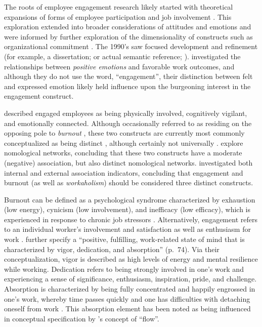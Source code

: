 \documentclass[
]{book}
\begin{document}
The roots of employee \citep[aka work; e.g.,][]{schaufeli_conceptualization_2010} engagement research likely started with theoretical expansions of forms of employee participation \citep[see, for example,][]{ferris_added_1984} and job involvement \citep[e.g.,][]{elloy_examination_1991}. This exploration extended into broader considerations of attitudes and emotions \citep{staw_employee_1994} and were informed by further exploration of the dimensionality of constructs such as organizational commitment \citep{meyer_three-component_1991}. The 1990's saw focused development and refinement (for example, a dissertation; \citet{leone_relation_1995} or actual semantic reference; \citet{kahn_psychological_1990}). \citet{staw_employee_1994} investigated the relationships between \emph{positive emotions} and favorable work outcomes, and although they do not use the word, ``engagement'', their distinction between felt and expressed emotion likely held influence upon the burgeoning interest in the engagement construct.

\citet{kahn_psychological_1990} described engaged employees as being physically involved, cognitively vigilant, and emotionally connected. Although occasionally referred to as residing on the opposing pole to \emph{burnout} \citep{maslach_early_2008}, these two constructs are currently most commonly conceptualized as being distinct \citep{timms2012burnt, kim_burnout_2009, goering2017not, schaufeli2008workaholism}, although certainly not universally \citep{cole2012job, taris2017burnout}. \citet{goering2017not} explore nomological networks, concluding that these two constructs have a moderate (negative) association, but also distinct nomological networks. \citet{schaufeli2008workaholism} investigated both internal and external association indicators, concluding that engagement and burnout (as well as \emph{workaholism}) should be considered three distinct constructs.

Burnout can be defined as a psychological syndrome characterized by exhaustion (low energy), cynicism (low involvement), and inefficacy (low efficacy), which is experienced in response to chronic job stressors \citep[e.g.,][]{leiter_areas_2004, maslach1997causes}. Alternatively, engagement refers to an individual worker's involvement and satisfaction as well as enthusiasm for work \citep{harter_business-unit-level_2002}. \citet{schaufeli_uwesutrecht_2003} further specify a ``positive, fulfilling, work-related state of mind that is characterized by vigor, dedication, and absorption'' (p.~74). Via their conceptualization, vigor is described as high levels of energy and mental resilience while working. Dedication refers to being strongly involved in one's work and experiencing a sense of significance, enthusiasm, inspiration, pride, and challenge. Absorption is characterized by being fully concentrated and happily engrossed in one's work, whereby time passes quickly and one has difficulties with detaching oneself from work \citep{schaufeli_measurement_2002}. This absorption element has been noted as being influenced in conceptual specification by \citep{csikszentmihalyi1990flow}'s concept of ``flow''.
\end{document}
